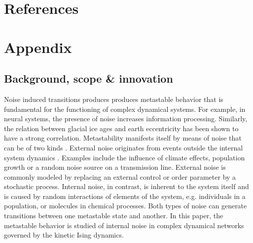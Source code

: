 \documentclass[a4paper, 11pt, twocolumn]{article}
\begin{document}
\section{References}
\label{sec:org26fe258}
\printbibliography[heading=none]


\newpage
\appendix
\section{Appendix}
\label{sec:org854db8e}

\subsection{Background, scope \& innovation}
\label{sec:orgd888f8c}
Noise  induced  transitions   produces  produces  metastable
behavior that is fundamental  for the functioning of complex
dynamical  systems.  For  example, in  neural  systems,  the
presence   of   noise  increases   information   processing.
Similarly, the  relation between glacial ice  ages and earth
eccentricity has  been shown  to have a  strong correlation.
Metastability manifests itself by means of noise that can be
of two  kinds \cite{Forgoston2018}. External  noise originates
from   events   outside   the   internal   system   dynamics
\cite{Calim2021,Czaplicka2013a}.    Examples    include    the
influence of climate effects,  population growth or a random
noise  source  on a  transmission  line.  External noise  is
commonly modeled  by replacing an external  control or order
parameter  by  a  stochastic  process.  Internal  noise,  in
contrast, is inherent to the  system itself and is caused by
random  interactions   of  elements  of  the   system,  e.g.
individuals  in  a  population,  or  molecules  in  chemical
processes.  Both types  of  noise  can generate  transitions
between one metastable state and another. In this paper, the
metastable behavior is studied  of internal noise in complex
dynamical networks governed by the kinetic Ising dynamics.
\end{document}
